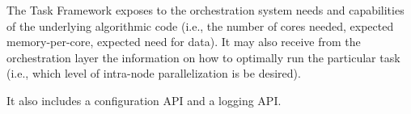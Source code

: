 \documentclass[DM,toc]{lsstdoc}
\begin{document}
The Task Framework exposes to the orchestration system needs and
capabilities of the underlying algorithmic code (i.e., the number of
cores needed, expected memory-per-core, expected need for data). It may
also receive from the orchestration layer the information on how to
optimally run the particular task (i.e., which level of intra-node
parallelization is be desired).

It also includes a configuration API and a logging API.





\end{document}
